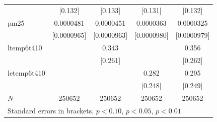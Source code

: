 \documentclass[11pt]{article}
\begin{document}
\begin{subappendices}
\begin{center}
{{\begin{tabular}{l*{4}{c}}
						&     [0.132]         &     [0.133]         &     [0.131]         &     [0.132]         \\
						[1em]
						pm25        &   0.0000481         &   0.0000451         &   0.0000363         &   0.0000325         \\
						& [0.0000965]         & [0.0000963]         & [0.0000980]         & [0.0000979]         \\
						[1em]
						ltemp6t410  &                     &       0.343         &                     &       0.356         \\
						&                     &     [0.261]         &                     &     [0.262]         \\
						[1em]
						letemp6t410 &                     &                     &       0.282         &       0.295         \\
						&                     &                     &     [0.248]         &     [0.249]         \\
						\hline
						\(N\)       &      250652         &      250652         &      250652         &      250652         \\
						\hline\hline
				\multicolumn{5}{l}{\footnotesize Standard errors in brackets. \sym{*} \(p<0.10\), \sym{**} \(p<0.05\), \sym{***} \(p<0.01\)}\\
					\end{tabular}
				}
				
			}
		\end{center}
		

\end{subappendices}
\end{document}
